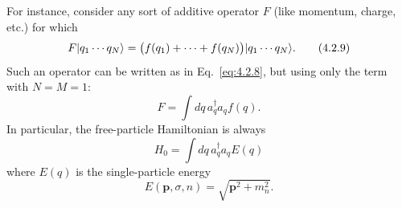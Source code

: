 For instance, consider any sort of additive operator $F$ (like momentum,
charge, etc.) for which
\begin{equation}
  F\lvert q_1\cdots q_N\rangle
  =\bigl(f(q_1)+\cdots+f(q_N)\bigr)\lvert q_1\cdots q_N\rangle.
  \tag{4.2.9}
  \label{eq:4.2.9}
\end{equation}
Such an operator can be written as in Eq.~\eqref{eq:4.2.8}, but using only the term
with $N=M=1$:
\begin{equation}
  F=\int dq\,a^\dagger_q a_q f(q).
  \tag{4.2.10}
  \label{eq:4.2.10}
\end{equation}
In particular, the free-particle Hamiltonian is always
\begin{equation}
  H_0=\int dq\,a^\dagger_q a_q E(q)
  \tag{4.2.11}
  \label{eq:4.2.11}
\end{equation}
where $E(q)$ is the single-particle energy
\[
  E(\mathbf p,\sigma,n)=\sqrt{\mathbf p^2+m_n^2}.
\]

